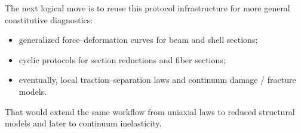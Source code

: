The next logical move is to reuse this protocol infrastructure for more general
constitutive diagnostics:

\begin{itemize}
  \item generalized force--deformation curves for beam and shell sections;
  \item cyclic protocols for section reductions and fiber sections;
  \item eventually, local traction--separation laws and continuum damage /
        fracture models.
\end{itemize}

That would extend the same workflow from uniaxial laws to reduced structural
models and later to continuum inelasticity.
